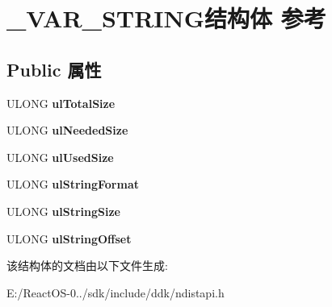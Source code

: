 \hypertarget{struct___v_a_r___s_t_r_i_n_g}{}\section{\+\_\+\+V\+A\+R\+\_\+\+S\+T\+R\+I\+N\+G结构体 参考}
\label{struct___v_a_r___s_t_r_i_n_g}
\subsection*{Public 属性}
\begin{DoxyCompactItemize}
\item 
\mbox{\label{struct___v_a_r___s_t_r_i_n_g_a0bdfd42356f18a6fa84f56d6e45602c4}} 
U\+L\+O\+NG {\bfseries ul\+Total\+Size}
\item 
\mbox{\label{struct___v_a_r___s_t_r_i_n_g_a6b2e778ddd9b4bbc35cc8552c9007f95}} 
U\+L\+O\+NG {\bfseries ul\+Needed\+Size}
\item 
\mbox{\label{struct___v_a_r___s_t_r_i_n_g_a6e157e853c01ba6e9a638624291bbcfb}} 
U\+L\+O\+NG {\bfseries ul\+Used\+Size}
\item 
\mbox{\label{struct___v_a_r___s_t_r_i_n_g_aa1c80374685e622fa3e6738602b80f3e}} 
U\+L\+O\+NG {\bfseries ul\+String\+Format}
\item 
\mbox{\label{struct___v_a_r___s_t_r_i_n_g_a53454159725f17bae7165cdd0dd8aa1e}} 
U\+L\+O\+NG {\bfseries ul\+String\+Size}
\item 
\mbox{\label{struct___v_a_r___s_t_r_i_n_g_ab22165d008a4a6a7180c9cb83f5e8bc8}} 
U\+L\+O\+NG {\bfseries ul\+String\+Offset}
\end{DoxyCompactItemize}


该结构体的文档由以下文件生成\+:\begin{DoxyCompactItemize}
\item 
E\+:/\+React\+O\+S-\/0../sdk/include/ddk/ndistapi.\+h\end{DoxyCompactItemize}
